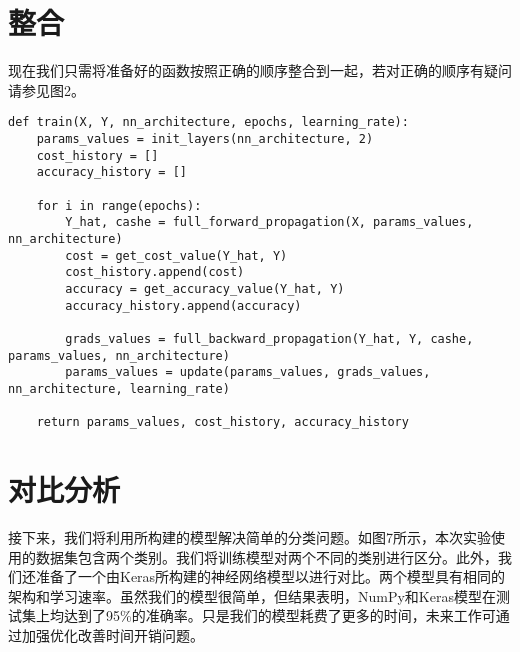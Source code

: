 \section{整合}

现在我们只需将准备好的函数按照正确的顺序整合到一起，若对正确的顺序有疑问请参见图2。

\begin{lstlisting}
def train(X, Y, nn_architecture, epochs, learning_rate):
    params_values = init_layers(nn_architecture, 2)
    cost_history = []
    accuracy_history = []
    
    for i in range(epochs):
        Y_hat, cashe = full_forward_propagation(X, params_values, nn_architecture)
        cost = get_cost_value(Y_hat, Y)
        cost_history.append(cost)
        accuracy = get_accuracy_value(Y_hat, Y)
        accuracy_history.append(accuracy)
        
        grads_values = full_backward_propagation(Y_hat, Y, cashe, params_values, nn_architecture)
        params_values = update(params_values, grads_values, nn_architecture, learning_rate)
        
    return params_values, cost_history, accuracy_history    
\end{lstlisting}

\section{对比分析}

接下来，我们将利用所构建的模型解决简单的分类问题。如图7所示，本次实验使用的数据集包含两个类别。我们将训练模型对两个不同的类别进行区分。此外，我们还准备了一个由Keras所构建的神经网络模型以进行对比。两个模型具有相同的架构和学习速率。虽然我们的模型很简单，但结果表明，NumPy和Keras模型在测试集上均达到了95\%的准确率。只是我们的模型耗费了更多的时间，未来工作可通过加强优化改善时间开销问题。